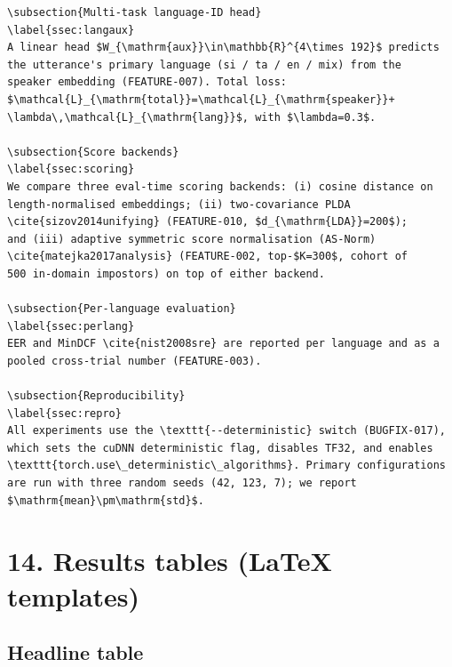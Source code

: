 \documentclass[10pt,a4paper]{article}
\begin{document}
\begin{Verbatim}[fontsize=\small,frame=single,framesep=4pt]
\subsection{Multi-task language-ID head}
\label{ssec:langaux}
A linear head $W_{\mathrm{aux}}\in\mathbb{R}^{4\times 192}$ predicts
the utterance's primary language (si / ta / en / mix) from the
speaker embedding (FEATURE-007). Total loss:
$\mathcal{L}_{\mathrm{total}}=\mathcal{L}_{\mathrm{speaker}}+
\lambda\,\mathcal{L}_{\mathrm{lang}}$, with $\lambda=0.3$.

\subsection{Score backends}
\label{ssec:scoring}
We compare three eval-time scoring backends: (i) cosine distance on
length-normalised embeddings; (ii) two-covariance PLDA
\cite{sizov2014unifying} (FEATURE-010, $d_{\mathrm{LDA}}=200$);
and (iii) adaptive symmetric score normalisation (AS-Norm)
\cite{matejka2017analysis} (FEATURE-002, top-$K=300$, cohort of
500 in-domain impostors) on top of either backend.

\subsection{Per-language evaluation}
\label{ssec:perlang}
EER and MinDCF \cite{nist2008sre} are reported per language and as a
pooled cross-trial number (FEATURE-003).

\subsection{Reproducibility}
\label{ssec:repro}
All experiments use the \texttt{--deterministic} switch (BUGFIX-017),
which sets the cuDNN deterministic flag, disables TF32, and enables
\texttt{torch.use\_deterministic\_algorithms}. Primary configurations
are run with three random seeds (42, 123, 7); we report
$\mathrm{mean}\pm\mathrm{std}$.
\end{Verbatim}


\section*{14. Results tables (LaTeX templates)}

\subsection*{Headline table}
\end{document}
